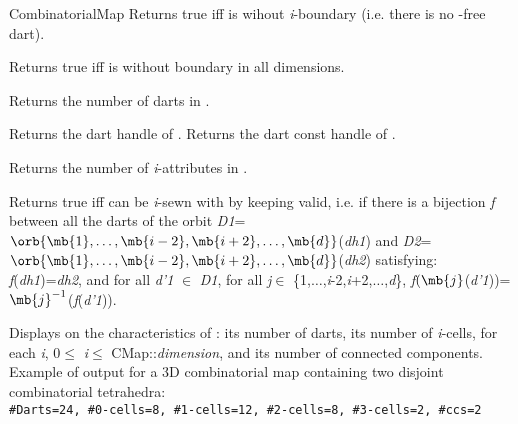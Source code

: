\begin{ccRefConcept}{CombinatorialMap}
         {Returns true iff  is wihout \emph{i}-boundary
          (i.e. there is no -free dart).
          }

         {Returns true iff  is without boundary in all dimensions.}

    {Returns the number of darts in .}

    {Returns the dart handle of .}
\ccGlue
{}
    {Returns the dart const handle of .}


   {Returns the number of \emph{i}-attributes in . 
     }

         {Returns true iff  can be \emph{i}-sewn with  by 
           keeping  valid, i.e. if there is
           a bijection \emph{f} between all the darts of the orbit
           \emph{D1}=$\orb{\mb{1},\ldots,\mb{i-2},\mb{i+2},\ldots,\mb{d}}$(\emph{dh1}) and
           \emph{D2}=$\orb{\mb{1},\ldots,\mb{i-2},\mb{i+2},\ldots,\mb{d}}$(\emph{dh2})
           satisfying: \emph{f}(\emph{dh1})=\emph{dh2}, and for all \emph{d'1} $\in$ \emph{D1}, for all \emph{j}$\in$
           \{1,$\ldots$,\emph{i}-2,\emph{i}+2,$\ldots$,\emph{d}\},
           \emph{f}$(\mb{j}$(\emph{d'1}))=$\mb{j}^{-1}$(\emph{f}(\emph{d'1})).           
          }	

{Displays on  the characteristics of : its number of darts, 
  its number of \emph{i}-cells, for each \emph{i}, 0$\leq$ \emph{i}$\leq$ CMap::\emph{dimension}, 
  and its number of connected components.}
Example of output for a 3D combinatorial map containing two disjoint
combinatorial tetrahedra:\\
\texttt{\#Darts=24, \#0-cells=8, \#1-cells=12, \#2-cells=8, \#3-cells=2, \#ccs=2}



\end{ccRefConcept}

